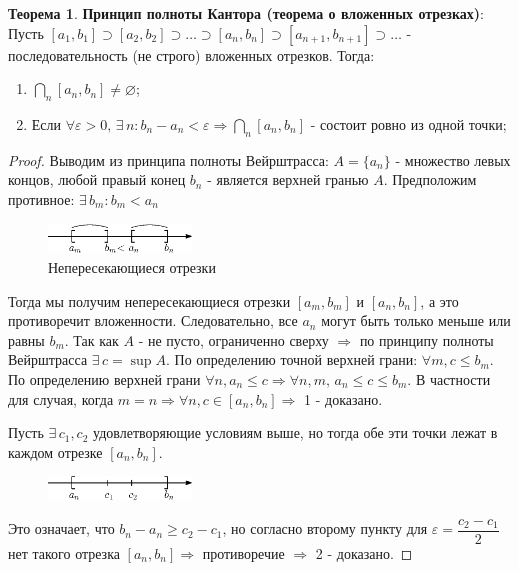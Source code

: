 \documentclass[12pt]{article}
\theoremstyle{definition}
\newtheorem{theorem}{Теорема}
\begin{document}
\begin{theorem}\textbf{Принцип полноты Кантора (теорема о вложенных отрезках)}:
	Пусть $[a_1,b_1] \supset [a_2,b_2] \supset \dotsc \supset[a_n,b_n] \supset [a_{n+1}, b_{n+1}] \supset \dotsc$ - последовательность (не строго) вложенных отрезков. Тогда:
	\begin{enumerate}
		\item $\bigcap\limits_{n} [a_n, b_n] \neq \varnothing$;
		\item Если $\forall \varepsilon >0, \, \exists\, n \colon b_n - a_n < \varepsilon \Rightarrow \bigcap\limits_{n} [a_n, b_n] $ - состоит ровно из одной точки;
	\end{enumerate}
\end{theorem}
\begin{proof}
	Выводим из принципа полноты Вейрштрасса:
	$A = \{a_n\}$ - множество левых концов, любой правый конец $b_n$ - является верхней гранью $A$.
	Предположим противное: $\exists \, b_m \colon b_m < a_n$
	
	\begin{figure}[H]
		\centering
		\includegraphics[width=0.34\textwidth]{7_2.eps}
	 	\caption{Непересекающиеся отрезки}
		\label{fig:7_2}
	\end{figure}
	
	Тогда мы получим непересекающиеся отрезки $[a_m, b_m]$ и $[a_n,b_n]$, а это противоречит вложенности. Следовательно, все $a_n$ могут быть только меньше  или равны $b_m$. Так как $A$ - не пусто, ограниченно сверху $\Rightarrow$ по принципу полноты Вейрштрасса $\exists \, c = \sup {A}$. 
	По определению точной верхней грани: $\forall m, c \leq b_m$. По определению верхней грани $\forall n, a_n \leq c \Rightarrow \forall n, m, \, a_n \leq c \leq b_m$. В частности для случая, когда $m =n \Rightarrow \forall n, c \in [a_n, b_n] \Rightarrow$ 1 - доказано. 
	
	Пусть $\exists \, c_1, c_2$ удовлетворяющие условиям выше, но тогда обе эти точки лежат в каждом отрезке $[a_n, b_n]$.
	 \begin{figure}[H]
	 	\centering
	 	\includegraphics[width=0.34\textwidth]{7_3.eps}
	 	\caption{}
	 	\label{fig:7_3}
	 \end{figure}
	Это означает, что $b_n - a_n \geq c_2 - c_1$, но согласно второму пункту для $\varepsilon =\dfrac{c_2 - c_1}{2}$ нет такого отрезка $[a_n,b_n] \Rightarrow$ противоречие $\Rightarrow$ 2 - доказано.
\end{proof}
\end{document}
